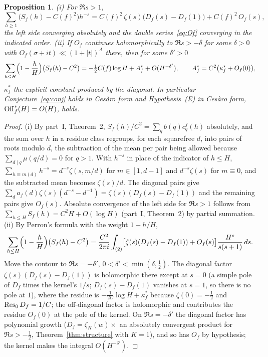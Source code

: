 \documentclass[11pt,a4paper]{article}
\newtheorem{proposition}[theorem]{Proposition}
\theoremstyle{remark}\newtheorem{remark}[theorem]{Remark}
\begin{document}
\begin{proposition}\label{prop:Of}
(i) For $\Re s>1$,
\[
\sum_{h\ge1}\bigl(S_f(h)-C(f)^2\bigr)h^{-s}=C(f)^2\,\zeta(s)\bigl(D_f(s)-D_f(1)\bigr)+C(f)^2\,O_f(s),
\]
the left side converging absolutely and the double series~\eqref{eq:Of} converging in the indicated order.
(ii) If $O_f$ continues holomorphically to $\Re s>-\delta$ for some $\delta>0$ with $O_f(\sigma+it)\ll(1+|t|)^{A}$
there, then for some $\delta'>0$
\[
\sum_{h\le H}\Bigl(1-\frac hH\Bigr)\bigl(S_f(h)-C^2\bigr)=-\tfrac12C(f)\log H+A_f^{\ast}+O(H^{-\delta'}),
\qquad A_f^\ast=C^2\bigl(\kappa^\ast_f+O_f(0)\bigr),
\]
$\kappa^\ast_f$ the explicit constant produced by the diagonal. In particular Conjecture~\eqref{eq:conj} holds
in Ces\`aro form and Hypothesis~(E) in Ces\`aro form, $\mathrm{Off}^\ast_f(H)=O(H)$, holds.
\end{proposition}
\begin{proof}
(i) By part~I, Theorem~2, $S_f(h)/C^2=\sum_qb(q)c^f_q(h)$ absolutely, and the sum over $h$ in a residue class
regroups, for each squarefree $d$, into pairs of roots modulo $d$, the subtraction of the mean per pair being
allowed because $\sum_{d\mid q}\mu(q/d)=0$ for $q>1$. With $h^{-s}$ in place of the indicator of $h\le H$,
$\sum_{h\equiv m(d)}h^{-s}=d^{-s}\zeta(s,m/d)$ for $m\in[1,d-1]$ and $d^{-s}\zeta(s)$ for $m\equiv0$, and the
subtracted mean becomes $\zeta(s)/d$. The diagonal pairs give $\sum_da_f(d)\zeta(s)(d^{-s}-d^{-1})=\zeta(s)(D_f(s)-D_f(1))$
and the remaining pairs give $O_f(s)$. Absolute convergence of the left side for $\Re s>1$ follows from
$\sum_{h\le H}S_f(h)=C^2H+O(\log H)$ (part~I, Theorem~2) by partial summation.
(ii) By Perron's formula with the weight $1-h/H$,
\[
\sum_{h\le H}\Bigl(1-\frac hH\Bigr)\bigl(S_f(h)-C^2\bigr)=\frac{C^2}{2\pi i}\int_{(2)}\bigl[\zeta(s)(D_f(s)-D_f(1))+O_f(s)\bigr]\frac{H^{s}}{s(s+1)}\,ds .
\]
Move the contour to $\Re s=-\delta'$, $0<\delta'<\min(\delta,\tfrac12)$. The diagonal factor
$\zeta(s)(D_f(s)-D_f(1))$ is holomorphic there except at $s=0$ (a simple pole of $D_f$ times the kernel's
$1/s$; $D_f(s)-D_f(1)$ vanishes at $s=1$, so there is no pole at $1$), where the residue is
$-\tfrac1{2C}\log H+\kappa^\ast_f$ because $\zeta(0)=-\tfrac12$ and $\operatorname*{Res}_0D_f=1/C$; the off-diagonal factor is
holomorphic and contributes the residue $O_f(0)$ at the pole of the kernel. On $\Re s=-\delta'$ the diagonal
factor has polynomial growth ($D_f=\zeta_K(w)\times$ an absolutely convergent product for $\Re s>-\tfrac12$,
Theorem~\ref{thm:structure} with $K=1$), and so has $O_f$ by hypothesis; the kernel makes the integral
$O(H^{-\delta'})$.
\end{proof}
\end{document}
